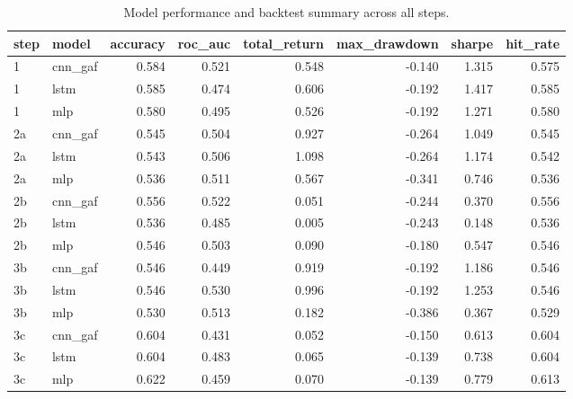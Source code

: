 \begin{table}[H]
\centering
\small
\caption{Model performance and backtest summary across all steps.}
\label{tab:metrics}
\begin{tabular}{llrrrrrr}
\toprule
step & model & accuracy & roc\_auc & total\_return & max\_drawdown & sharpe & hit\_rate \\
\midrule
1 & cnn\_gaf & 0.584 & 0.521 & 0.548 & -0.140 & 1.315 & 0.575 \\
1 & lstm & 0.585 & 0.474 & 0.606 & -0.192 & 1.417 & 0.585 \\
1 & mlp & 0.580 & 0.495 & 0.526 & -0.192 & 1.271 & 0.580 \\
2a & cnn\_gaf & 0.545 & 0.504 & 0.927 & -0.264 & 1.049 & 0.545 \\
2a & lstm & 0.543 & 0.506 & 1.098 & -0.264 & 1.174 & 0.542 \\
2a & mlp & 0.536 & 0.511 & 0.567 & -0.341 & 0.746 & 0.536 \\
2b & cnn\_gaf & 0.556 & 0.522 & 0.051 & -0.244 & 0.370 & 0.556 \\
2b & lstm & 0.536 & 0.485 & 0.005 & -0.243 & 0.148 & 0.536 \\
2b & mlp & 0.546 & 0.503 & 0.090 & -0.180 & 0.547 & 0.546 \\
3b & cnn\_gaf & 0.546 & 0.449 & 0.919 & -0.192 & 1.186 & 0.546 \\
3b & lstm & 0.546 & 0.530 & 0.996 & -0.192 & 1.253 & 0.546 \\
3b & mlp & 0.530 & 0.513 & 0.182 & -0.386 & 0.367 & 0.529 \\
3c & cnn\_gaf & 0.604 & 0.431 & 0.052 & -0.150 & 0.613 & 0.604 \\
3c & lstm & 0.604 & 0.483 & 0.065 & -0.139 & 0.738 & 0.604 \\
3c & mlp & 0.622 & 0.459 & 0.070 & -0.139 & 0.779 & 0.613 \\
\bottomrule
\end{tabular}

\end{table}
